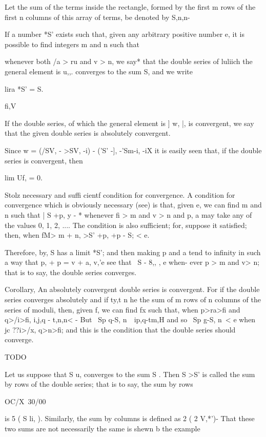 %
%

Let the sum of the terms inside the rectangle, formed by the first m
rows of the first n columns of this array of terms, be denoted by
S,n,n-

If a number *S' exists such that, given any arbitrary positive number
e, it is possible to find integers m and n such that

whenever both /a > ru and v > n, we say* that the double series of
luliich the general element is u,,. converges to the sum S, and we
write

lira *S' = S.

 fi,V

If the double series, of which the general element is ] w, |, is
convergent, we say that the given double series is absolutely
convergent.

Since w = (/SV, - >SV, -i) - ('S' -], -'Sm-i, -iX it is easily seen
that, if the double series is convergent, then

lim Uf, = 0.

Stolz necessary and suffi cientf condition for convergence. A
condition for convergence which is obviously necessary (see) is
that, given e, we can find m and n such that | S +p, y - *%
whenever fi > m and v > n and p, a may take any of the values 0, 1, 2,
.... The condition is also sufficient; for, suppose it satisfied;
then, when fM> m + n, >S' +p, +p - S; < e.

Therefore, by, S has a limit *S'; and then making p and a tend
to infinity in such a way that p, + p = v + a, v,'e see that \ S - 8,,
, e when- ever p > m and v> n; that is to say, the double series
converges.

Corollary, An absolutely convergent double series is convergent. For
if the double series converges absolutely and if ty,t n he the sum of
m rows of n columns of the series of moduli, then, given f, we can
find fx such that, when p>ra>fi and q>/i>fi, i,j,q - t,n,n< - But \ Sp
q-S, n\ \ ip,q-tm,H and so \ Sp g-S, n\ < e when jc ??i>/x, q>n>fi;
and this is the condition that the double series should converge.

TODO

Let us suppose that S u, converges to the sum S . Then S >S' is
called the sum by rows of the double series; that is to say, the sum
by rows

OC/X\ 30/00\

is 5 ( S li, ). Similarly, the sum by columns is defined as 2 ( 2
V,*')- That these two sums are not necessarily the same is shewn b the
example

